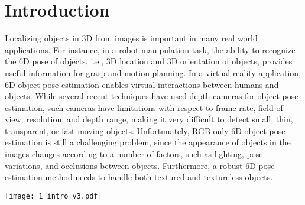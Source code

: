 \documentclass[twocolumn]{svjour3}
\newcommand{\dimnet}[0]{DeepIM}
\begin{document}
\section{Introduction}

Localizing objects in 3D from images is important in many real world applications. For instance, in a robot manipulation task, the ability to recognize the 6D pose of objects, i.e., 3D location and 3D orientation of objects, provides useful information for grasp and motion planning. In a virtual reality application, 6D object pose estimation enables virtual interactions between humans and objects. While several recent techniques have used depth cameras for object pose estimation, such cameras have limitations with respect to frame rate, field of view, resolution, and depth range, making it very difficult to detect small, thin, transparent, or fast moving objects. Unfortunately, RGB-only 6D object pose estimation is still a challenging problem, since the appearance of objects in the images changes according to a number of factors, such as lighting, pose variations, and occlusions between objects. Furthermore, a robust 6D pose estimation method needs to handle both textured and textureless objects. 

\begin{figure*}[t]
	\centering
	\texttt{[image: 1\_intro\_v3.pdf]}
	\caption{\footnotesize{We propose \dimnet, a deep iterative matching network for 6D object pose estimation. The network is trained to predict a relative SE(3) transformation that can be applied to an initial pose estimation for iterative pose refinement.}}
	\label{fig:intro}
\end{figure*}
\end{document}
